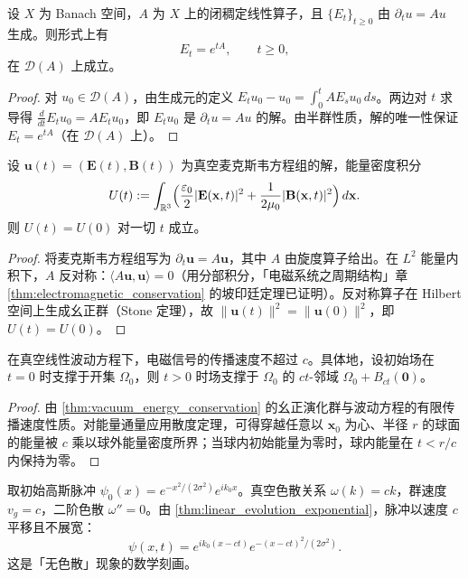 \begin{theorem}[线性演化方程的指数表示]\label{thm:linear_evolution_exponential}
设 $X$ 为 Banach 空间，$A$ 为 $X$ 上的闭稠定线性算子，且 $\{E_t\}_{t\ge 0}$ 由 $\partial_t u = Au$ 生成。则形式上有
\[
E_t = e^{tA}, \qquad t\ge 0,
\]
在 $\mathcal{D}(A)$ 上成立。
\end{theorem}

\begin{proof}
对 $u_0\in\mathcal{D}(A)$，由生成元的定义 $E_t u_0 - u_0 = \int_0^t AE_s u_0\,ds$。两边对 $t$ 求导得 $\frac{d}{dt}E_t u_0 = AE_t u_0$，即 $E_t u_0$ 是 $\partial_t u = Au$ 的解。由半群性质，解的唯一性保证 $E_t = e^{tA}$（在 $\mathcal{D}(A)$ 上）。
\end{proof}

\begin{theorem}[真空光传播的能量守恒]\label{thm:vacuum_energy_conservation}
设 $\mathbf{u}(t) = (\mathbf{E}(t),\mathbf{B}(t))$ 为真空麦克斯韦方程组的解，能量密度积分
\[
U(t) := \int_{\mathbb{R}^3}\Bigl(\frac{\varepsilon_0}{2}|\mathbf{E}(\mathbf{x},t)|^2 + \frac{1}{2\mu_0}|\mathbf{B}(\mathbf{x},t)|^2\Bigr)\,d\mathbf{x}.
\]
则 $U(t) = U(0)$ 对一切 $t$ 成立。
\end{theorem}

\begin{proof}
将麦克斯韦方程组写为 $\partial_t\mathbf{u} = A\mathbf{u}$，其中 $A$ 由旋度算子给出。在 $L^2$ 能量内积下，$A$ 反对称：$\langle A\mathbf{u},\mathbf{u}\rangle = 0$（用分部积分，「电磁系统之周期结构」章 \cref{thm:electromagnetic_conservation} 的坡印廷定理已证明）。反对称算子在 Hilbert 空间上生成幺正群（Stone 定理），故 $\|\mathbf{u}(t)\|^2 = \|\mathbf{u}(0)\|^2$，即 $U(t)=U(0)$。
\end{proof}

\begin{corollary}[因果性的数学表述]\label{cor:causality_speed}
在真空线性波动方程下，电磁信号的传播速度不超过 $c$。具体地，设初始场在 $t=0$ 时支撑于开集 $\Omega_0$，则 $t>0$ 时场支撑于 $\Omega_0$ 的 $ct$-邻域 $\Omega_0 + B_{ct}(\mathbf{0})$。
\end{corollary}

\begin{proof}
由 \cref{thm:vacuum_energy_conservation} 的幺正演化群与波动方程的有限传播速度性质。对能量通量应用散度定理，可得穿越任意以 $\mathbf{x}_0$ 为心、半径 $r$ 的球面的能量被 $c$ 乘以球外能量密度所界；当球内初始能量为零时，球内能量在 $t<r/c$ 内保持为零。
\end{proof}

\begin{example}[真空中的高斯光脉冲]\label{ex:vacuum_gaussian_pulse}
取初始高斯脉冲 $\psi_0(x) = e^{-x^2/(2\sigma^2)}e^{ik_0x}$。真空色散关系 $\omega(k) = ck$，群速度 $v_g = c$，二阶色散 $\omega''=0$。由 \cref{thm:linear_evolution_exponential}，脉冲以速度 $c$ 平移且不展宽：
\[
\psi(x,t) = e^{ik_0(x-ct)}e^{-(x-ct)^2/(2\sigma^2)}.
\]
这是「无色散」现象的数学刻画。
\end{example}


